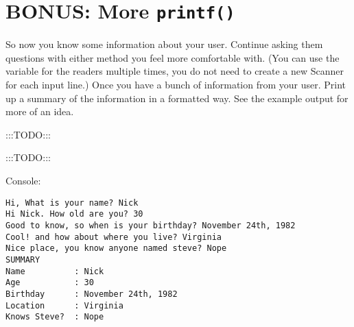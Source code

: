 \documentclass{report}
\begin{document}
\newpage

\section{BONUS: More \texttt{printf()}}

So now you know some information about your user. Continue asking them questions with either method you feel more comfortable with. (You can use the variable for the readers multiple times, you do not need to create a new Scanner for each input line.) Once you have a bunch of information from your user. Print up a summary of the information in a formatted way. See the example output for more of an idea.

:::TODO:::

:::TODO:::

Console:
\begin{lstlisting}
Hi, What is your name? Nick
Hi Nick. How old are you? 30
Good to know, so when is your birthday? November 24th, 1982
Cool! and how about where you live? Virginia
Nice place, you know anyone named steve? Nope
SUMMARY
Name          : Nick                          
Age           : 30                            
Birthday      : November 24th, 1982           
Location      : Virginia                      
Knows Steve?  : Nope  
\end{lstlisting}
\end{document}
